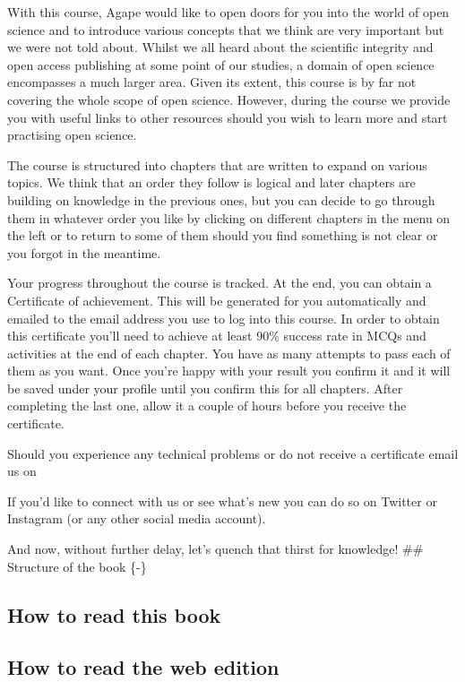 \documentclass[
]{book}
\theoremstyle{definition}
\theoremstyle{definition}
\theoremstyle{definition}
\theoremstyle{definition}
\theoremstyle{remark}
\begin{document}
With this course, Agape would like to open doors for you into the world of open science and to introduce various concepts that we think are very important but we were not told about. Whilst we all heard about the scientific integrity and open access publishing at some point of our studies, a domain of open science encompasses a much larger area. Given its extent, this course is by far not covering the whole scope of open science. However, during the course we provide you with useful links to other resources should you wish to learn more and start practising open science.

The course is structured into chapters that are written to expand on various topics. We think that an order they follow is logical and later chapters are building on knowledge in the previous ones, but you can decide to go through them in whatever order you like by clicking on different chapters in the menu on the left or to return to some of them should you find something is not clear or you forgot in the meantime.

Your progress throughout the course is tracked. At the end, you can obtain a Certificate of achievement. This will be generated for you automatically and emailed to the email address you use to log into this course. In order to obtain this certificate you'll need to achieve at least 90\% success rate in MCQs and activities at the end of each chapter. You have as many attempts to pass each of them as you want. Once you're happy with your result you confirm it and it will be saved under your profile until you confirm this for all chapters. After completing the last one, allow it a couple of hours before you receive the certificate.

Should you experience any technical problems or do not receive a certificate email us on

If you'd like to connect with us or see what's new you can do so on Twitter or Instagram (or any other social media account).

And now, without further delay, let's quench that thirst for knowledge!
\#\# Structure of the book \{-\}

\hypertarget{how-to-read-this-book}{%
\subsection*{How to read this book}\label{how-to-read-this-book}}

\hypertarget{how-to-read-the-web-edition}{%
\subsection*{How to read the web edition}\label{how-to-read-the-web-edition}}
\end{document}
